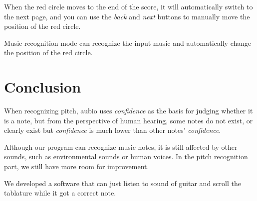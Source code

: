 \documentclass[10pt,twocolumn,letterpaper]{article}
\begin{document}
\begin{CJK}{UTF8}{bsmi}
When the red circle moves to the end of the score, it will automatically switch to the next page, and you can use the \emph{back} and \emph{next} buttons to manually move the position of the red circle.

Music recognition mode can recognize the input music and automatically change the position of the red circle.

\section{Conclusion}

When recognizing pitch, aubio uses \emph{confidence} as the basis for judging whether it is a note, but from the perspective of human hearing, some notes do not exist, or clearly exist but \emph{confidence} is much lower than other notes' \emph{confidence}.

Although our program can recognize music notes, it is still affected by other sounds, such as environmental sounds or human voices. In the pitch recognition part, we still have more room for improvement. 

We developed a software that can just listen to sound of guitar and scroll the tablature while it got a correct note.
{\small
    
    
}

\end{CJK}
\end{document}
